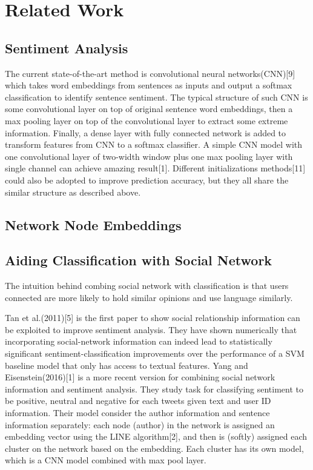 \section{Related Work}

\subsection*{Sentiment Analysis}

The current state-of-the-art method is convolutional neural networks(CNN)[9] which takes word embeddings from sentences as inputs and output a softmax classification to identify sentence sentiment. The typical structure of such CNN is some convolutional layer on top of original sentence word embeddings, then a max pooling layer on top of the convolutional layer to extract some extreme information.  Finally, a dense layer with fully connected network is added to transform features from CNN to a softmax classifier. A simple CNN model with one convolutional layer of two-width window plus one max pooling layer with single channel can achieve amazing result[1]. Different initializations methods[11] could also be adopted to improve prediction accuracy, but they all share the similar structure as described above.


\subsection*{Network Node Embeddings}


\subsection*{Aiding Classification with Social Network}

The intuition behind combing social network with classification is that users connected are more likely to hold similar opinions and use language similarly. 

Tan et al.(2011)[5] is the first paper to show social relationship information can be exploited to improve sentiment analysis. They have shown numerically that incorporating social-network information can indeed lead to statistically significant sentiment-classification improvements over the performance of a SVM baseline model that only has access to textual features. Yang and Eisenstein(2016)[1] is a more recent version for combining social network information and sentiment analysis. They study task for classifying sentiment to be positive, neutral and negative for each tweets given text and user ID information. Their model consider the author information and sentence information separately: each node (author) in the network is assigned an embedding vector using the LINE algorithm[2], and then is (softly) assigned each cluster on the network based on the embedding. Each cluster has its own model, which is a CNN model combined with max pool layer.


